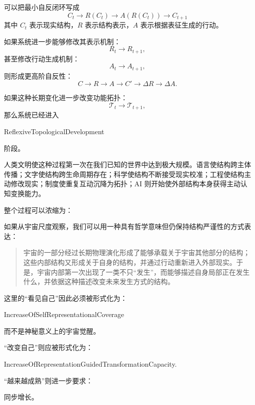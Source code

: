 可以把最小自反闭环写成
\[
\boxed{
C_t
\rightarrow
R(C_t)
\rightarrow
A(R(C_t))
\rightarrow
C_{t+1}
}
\]
其中 $C_t$ 表示现实结构，$R$ 表示结构表示，$A$ 表示根据表征生成的行动。

如果系统进一步能够修改其表示机制：
\[
R_t\rightarrow R_{t+1},
\]
甚至修改行动生成机制：
\[
A_t\rightarrow A_{t+1},
\]
则形成更高阶自反性：
\[
\boxed{
C
\rightarrow
R
\rightarrow
A
\rightarrow
C'
\rightarrow
\Delta R
\rightarrow
\Delta A.
}
\]

如果这种长期变化进一步改变功能拓扑：
\[
\mathcal T_t
\rightarrow
\mathcal T_{t+1},
\]
那么系统已经进入
\begin{statementbox}
ReflexiveTopologicalDevelopment
\end{statementbox}
阶段。

人类文明使这种过程第一次在我们已知的世界中达到极大规模。语言使结构跨主体传播；文字使结构跨生命周期存在；科学使结构不断接受现实校准；工程使结构主动修改现实；制度使重复互动沉降为拓扑；AI 则开始使外部结构本身获得主动认知变换能力。

整个过程可以浓缩为：

\begin{statementbox}
\centering
{}
\end{statementbox}

如果从宇宙尺度观察，我们可以用一种具有哲学意味但仍保持结构严谨性的方式表达：

\begin{quote}
宇宙的一部分经过长期物理演化形成了能够承载关于宇宙其他部分的结构；这些内部结构又形成关于自身的结构，并通过行动重新进入外部现实。于是，宇宙内部第一次出现了一类不只“发生”，而能够描述自身局部正在发生什么，并依据这种描述改变未来发生方式的结构。
\end{quote}

这里的“看见自己”因此必须被形式化为：
\begin{statementbox}
IncreaseOfSelfRepresentationalCoverage
\end{statementbox}
而不是神秘意义上的宇宙觉醒。

“改变自己”则应被形式化为：
\begin{statementbox}
IncreaseOfRepresentationGuidedTransformationCapacity.
\end{statementbox}

“越来越成熟”则进一步要求：
\begin{statementbox}
\centering
{}
\end{statementbox}
同步增长。

